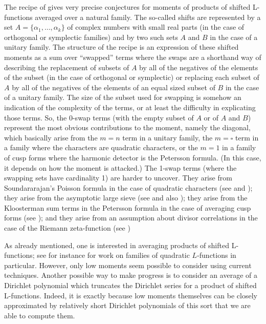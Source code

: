 \documentclass[12pt]{amsart}
\begin{document}
	The recipe of \cite{CFKRS} gives very precise conjectures for moments of products of shifted L-functions averaged over a natural family. 
	The so-called shifts are represented by a set $A=\{\alpha_1,\dots,\alpha_k\}$ of complex numbers with small real parts (in the case of orthogonal or symplectic families) and by two such sets $A$ and $B$ in the
	case of a unitary family.  
	The structure of the recipe is an expression of these shifted moments as a sum over ``swapped'' terms where the swaps are a shorthand way of 
	describing the replacement of  
	subsets of $A$ by all of the negatives of the elements of the subset (in the case of orthogonal or symplectic) or replacing  each subset of $A$ by
	all of the negatives of the elements of an equal sized subset of $B$ in the case of a unitary family.
	The size of the subset used for swapping is somehow  an indication of the complexity 
	of the terms, or at least the difficulty in explicating those terms. So, the 0-swap terms (with the empty subset of $A$ or of $A$ and $B$)
	represent the most obvious contributions to the moment, namely the diagonal, which basically arise from the $m=n$ term 
	in a unitary family, the $m=\square$ term in a family where the characters are quadratic characters, or the $m=1$ in a family of 
	cusp forms where the harmonic detector is the Petersson formula. (In this case, it depends on how the moment is attacked.)
	The 1-swap terms (where the swapping sets have cardinality 1) are harder to uncover. They arise from Soundararajan's Poisson formula in the case of
	quadratic characters (see \cite{Sou} and \cite{Flo1});  they arise from the asymptotic large sieve (see \cite{CoIwSou,ChLi} and also \cite{RoSou});
	they arise from the Kloosterman sum terms in the Petersson formula in the case of averaging cusp forms (see \cite{KoMiVa}); 
	and they arise from an assumption about divisor correlations in the case of the Riemann zeta-function (see \cite{CoGh,CoGo})
	
	As already mentioned, one is interested in averaging  products of shifted L-functions; see for instance \cite{AnKe, Flo1, Flo2, Flo3, DiWh, Di, Son, Dj} for work on families of quadratic $L$-functions in particular.
	However, only low moments seem possible to consider using current techniques. 
	Another possible way to make progress is to consider an average of a Dirichlet polynomial which truncates the Dirichlet series for a product of shifted L-functions.
	Indeed, it is exactly because low moments themselves can be closely approximated by relatively short Dirichlet polynomials of this sort that we are able to compute them.
	
\end{document}
